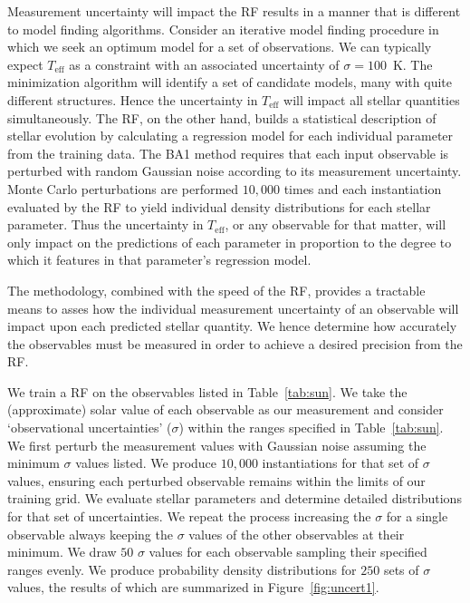  
Measurement uncertainty will impact the RF results in a manner that is different to model finding algorithms. Consider an iterative model finding procedure in which we seek an  optimum model for a set of observations. We can typically expect $T_{\text{eff}}$ as a constraint with an associated  uncertainty of ${\sigma = 100}$~K.  The minimization algorithm will identify a set of candidate models, many with quite different structures. Hence the uncertainty in $T_{\text{eff}}$  will impact %
all stellar quantities simultaneously.  The  RF, on the other hand,
 builds a statistical description of stellar evolution by calculating a regression model for each individual parameter from the training data. 
 The BA1 method requires that each input observable is perturbed with random Gaussian noise according to its measurement uncertainty. Monte Carlo perturbations are performed $10,000$ times and each instantiation evaluated by the RF to yield individual density distributions for each stellar parameter. Thus the uncertainty in $T_{\text{eff}}$, or any observable for that matter, will only impact on the predictions 
 of each parameter in proportion to the degree to which it features in that parameter's regression model.  

 
 The methodology, combined with the speed of the RF, provides a tractable means to 
 asses how the individual measurement uncertainty of an observable will impact upon each predicted stellar quantity. We hence determine  how accurately the observables must be measured in order to achieve a desired precision from the RF.
 
 
 
We train a RF on the observables listed in Table~\ref{tab:sun}.
We take the (approximate) solar value of each observable as our measurement and consider
`observational uncertainties' ($\sigma$) within the ranges specified in Table~\ref{tab:sun}. 
We first perturb the measurement values with Gaussian noise assuming the minimum $\sigma$ values listed. We produce $10,000$ instantiations for that set of $\sigma$ values, ensuring each perturbed observable remains within the limits of our training grid.
We evaluate stellar parameters and determine detailed distributions for that set of uncertainties. We repeat the process increasing the $\sigma$ for a single observable  always keeping the  $\sigma$ values of the other observables at their minimum. 
We draw $50$ $\sigma$ values for each observable sampling their specified ranges evenly.  We produce  probability density distributions for $250$ sets of $\sigma$ values, the results of which are summarized in Figure~\ref{fig:uncert1}.  


